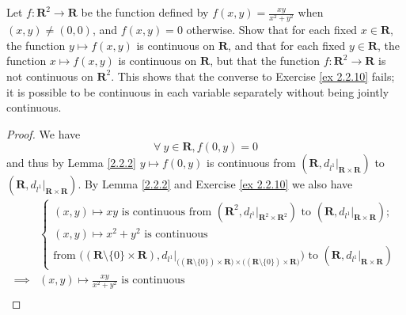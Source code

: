 \begin{exercise}\label{ex 2.2.11}
    Let \(f : \mathbf{R}^2 \to \mathbf{R}\) be the function defined by \(f(x, y) = \frac{xy}{x^2 + y^2}\) when \((x, y) \neq (0, 0)\), and \(f(x, y) = 0\) otherwise.
    Show that for each fixed \(x \in \mathbf{R}\), the function \(y \mapsto f(x, y)\) is continuous on \(\mathbf{R}\), and that for each fixed \(y \in \mathbf{R}\), the function \(x \mapsto f(x, y)\) is continuous on \(\mathbf{R}\), but that the function \(f : \mathbf{R}^2 \to \mathbf{R}\) is not continuous on \(\mathbf{R}^2\).
    This shows that the converse to Exercise \ref{ex 2.2.10} fails;
    it is possible to be continuous in each variable separately without being jointly continuous.
\end{exercise}

\begin{proof}
    We have
    \[
        \forall\ y \in \mathbf{R}, f(0, y) = 0
    \]
    and thus by Lemma \ref{2.2.2} \(y \mapsto f(0, y)\) is continuous from \((\mathbf{R}, d_{l^1}|_{\mathbf{R} \times \mathbf{R}})\) to \((\mathbf{R}, d_{l^1}|_{\mathbf{R} \times \mathbf{R}})\).
    By Lemma \ref{2.2.2} and Exercise \ref{ex 2.2.10} we also have
    \begin{align*}
                 & \begin{cases}
            (x, y) \mapsto x y \text{ is continuous from } (\mathbf{R}^2, d_{l^1}|_{\mathbf{R}^2 \times \mathbf{R}^2}) \text{ to } (\mathbf{R}, d_{l^1}|_{\mathbf{R} \times \mathbf{R}}); \\
            (x, y) \mapsto x^2 + y^2 \text{ is continuous}                                                                                                                                \\
            \text{from } \big((\mathbf{R} \setminus \{0\} \times \mathbf{R}), d_{l^1}|_{\big((\mathbf{R} \setminus \{0\}) \times \mathbf{R}\big) \times \big((\mathbf{R} \setminus \{0\}) \times \mathbf{R}\big)}\big) \text{ to } (\mathbf{R}, d_{l^1}|_{\mathbf{R} \times \mathbf{R}})
        \end{cases}                                                                                                                                                                                                                                                   \\
        \implies & (x, y) \mapsto \frac{xy}{x^2 + y^2} \text{ is continuous}                                                                                                                                                                                                                    \\

\end{align*}
\end{proof}
